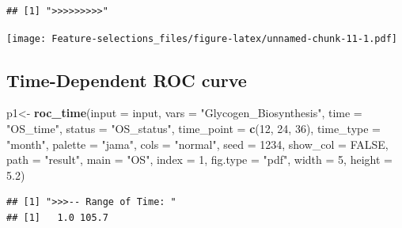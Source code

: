 \documentclass[
  12pt,
]{book}
\newenvironment{Shaded}{\begin{snugshade}}{\end{snugshade}}
\newcommand{\AttributeTok}[1]{\textcolor[rgb]{0.13,0.29,0.53}{#1}}
\newcommand{\ConstantTok}[1]{\textcolor[rgb]{0.56,0.35,0.01}{#1}}
\newcommand{\DecValTok}[1]{\textcolor[rgb]{0.00,0.00,0.81}{#1}}
\newcommand{\FloatTok}[1]{\textcolor[rgb]{0.00,0.00,0.81}{#1}}
\newcommand{\FunctionTok}[1]{\textcolor[rgb]{0.13,0.29,0.53}{\textbf{#1}}}
\newcommand{\NormalTok}[1]{#1}
\newcommand{\OtherTok}[1]{\textcolor[rgb]{0.56,0.35,0.01}{#1}}
\newcommand{\SpecialCharTok}[1]{\textcolor[rgb]{0.81,0.36,0.00}{\textbf{#1}}}
\newcommand{\StringTok}[1]{\textcolor[rgb]{0.31,0.60,0.02}{#1}}
\begin{document}
\begin{verbatim}
## [1] ">>>>>>>>>"
\end{verbatim}

\begin{Shaded}
\end{Shaded}

\texttt{[image: Feature-selections\_files/figure-latex/unnamed-chunk-11-1.pdf]}

\hypertarget{time-dependent-roc-curve}{%
\subsection{Time-Dependent ROC curve}\label{time-dependent-roc-curve}}

\begin{Shaded}
\begin{Highlighting}[]
\NormalTok{p1}\OtherTok{\textless{}{-}} \FunctionTok{roc\_time}\NormalTok{(}\AttributeTok{input      =}\NormalTok{ input,  }
             \AttributeTok{vars       =} \StringTok{"Glycogen\_Biosynthesis"}\NormalTok{, }
             \AttributeTok{time       =} \StringTok{"OS\_time"}\NormalTok{,}
             \AttributeTok{status     =} \StringTok{"OS\_status"}\NormalTok{, }
             \AttributeTok{time\_point =} \FunctionTok{c}\NormalTok{(}\DecValTok{12}\NormalTok{, }\DecValTok{24}\NormalTok{, }\DecValTok{36}\NormalTok{), }
             \AttributeTok{time\_type  =} \StringTok{"month"}\NormalTok{,}
             \AttributeTok{palette    =} \StringTok{"jama"}\NormalTok{,}
             \AttributeTok{cols       =} \StringTok{"normal"}\NormalTok{,}
             \AttributeTok{seed       =} \DecValTok{1234}\NormalTok{, }
             \AttributeTok{show\_col   =} \ConstantTok{FALSE}\NormalTok{, }
             \AttributeTok{path       =} \StringTok{"result"}\NormalTok{, }
             \AttributeTok{main       =} \StringTok{"OS"}\NormalTok{,}
             \AttributeTok{index      =} \DecValTok{1}\NormalTok{,}
             \AttributeTok{fig.type   =} \StringTok{"pdf"}\NormalTok{,}
             \AttributeTok{width      =} \DecValTok{5}\NormalTok{,}
             \AttributeTok{height     =} \FloatTok{5.2}\NormalTok{)}
\end{Highlighting}
\end{Shaded}

\begin{verbatim}
## [1] ">>>-- Range of Time: "
## [1]   1.0 105.7
\end{verbatim}
\end{document}
